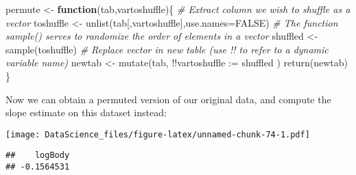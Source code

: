 \documentclass[
]{book}
\newenvironment{Shaded}{\begin{snugshade}}{\end{snugshade}}
\newcommand{\AttributeTok}[1]{\textcolor[rgb]{0.77,0.63,0.00}{#1}}
\newcommand{\CommentTok}[1]{\textcolor[rgb]{0.56,0.35,0.01}{\textit{#1}}}
\newcommand{\ConstantTok}[1]{\textcolor[rgb]{0.00,0.00,0.00}{#1}}
\newcommand{\ControlFlowTok}[1]{\textcolor[rgb]{0.13,0.29,0.53}{\textbf{#1}}}
\newcommand{\DecValTok}[1]{\textcolor[rgb]{0.00,0.00,0.81}{#1}}
\newcommand{\FunctionTok}[1]{\textcolor[rgb]{0.00,0.00,0.00}{#1}}
\newcommand{\NormalTok}[1]{#1}
\newcommand{\OtherTok}[1]{\textcolor[rgb]{0.56,0.35,0.01}{#1}}
\newcommand{\SpecialCharTok}[1]{\textcolor[rgb]{0.00,0.00,0.00}{#1}}
\newcommand{\StringTok}[1]{\textcolor[rgb]{0.31,0.60,0.02}{#1}}
\begin{document}
\begin{Shaded}
\begin{Highlighting}[]
\NormalTok{permute }\OtherTok{\textless{}{-}} \ControlFlowTok{function}\NormalTok{(tab,vartoshuffle)\{}
  \CommentTok{\# Extract column we wish to shuffle as a vector}
\NormalTok{  toshuffle }\OtherTok{\textless{}{-}} \FunctionTok{unlist}\NormalTok{(tab[,vartoshuffle],}\AttributeTok{use.names=}\ConstantTok{FALSE}\NormalTok{)}
  \CommentTok{\# The function sample() serves to randomize the order of elements in a vector}
\NormalTok{  shuffled }\OtherTok{\textless{}{-}} \FunctionTok{sample}\NormalTok{(toshuffle)}
  \CommentTok{\# Replace vector in new table (use !! to refer to a dynamic variable name)}
\NormalTok{  newtab }\OtherTok{\textless{}{-}} \FunctionTok{mutate}\NormalTok{(tab, }\SpecialCharTok{!!}\AttributeTok{vartoshuffle :=}\NormalTok{ shuffled )}
  \FunctionTok{return}\NormalTok{(newtab)}
\NormalTok{\}}
\end{Highlighting}
\end{Shaded}

Now we can obtain a permuted version of our original data, and compute the slope estimate on this dataset instead:

\begin{Shaded}
\end{Shaded}

\texttt{[image: DataScience\_files/figure-latex/unnamed-chunk-74-1.pdf]}

\begin{Shaded}
\end{Shaded}

\begin{verbatim}
##    logBody 
## -0.1564531
\end{verbatim}
\end{document}
